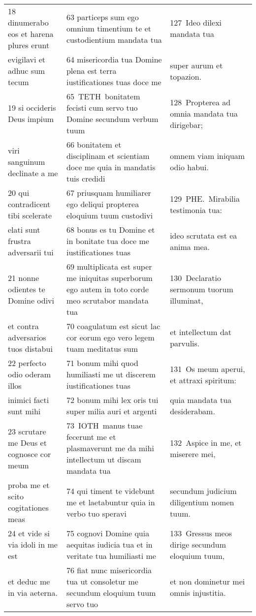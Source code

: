 \documentclass{article}
\begin{document}
\begin{longtable}{@{}p{}p{}p{}@{}}
18 dinumerabo eos et harena plures erunt	&	63 particeps sum ego omnium timentium te et custodientium mandata tua	&	127 Ideo dilexi mandata tua	\\
evigilavi et adhuc sum tecum	&	64 misericordia tua Domine plena est terra iustificationes tuas doce me	&	super aurum et topazion.	\\
19 si occideris Deus impium	&	65 TETH bonitatem fecisti cum servo tuo Domine secundum verbum tuum	&	128 Propterea ad omnia mandata tua dirigebar;	\\
viri sanguinum declinate a me	&	66 bonitatem et disciplinam et scientiam doce me quia in mandatis tuis credidi	&	omnem viam iniquam odio habui.	\\
20 qui contradicent tibi scelerate	&	67 priusquam humiliarer ego deliqui propterea eloquium tuum custodivi	&	129 PHE. Mirabilia testimonia tua:	\\
elati sunt frustra adversarii tui	&	68 bonus es tu Domine et in bonitate tua doce me iustificationes tuas	&	ideo scrutata est ea anima mea.	\\
21 nonne odientes te Domine odivi	&	69 multiplicata est super me iniquitas superborum ego autem in toto corde meo scrutabor mandata tua	&	130 Declaratio sermonum tuorum illuminat,	\\
et contra adversarios tuos distabui	&	70 coagulatum est sicut lac cor eorum ego vero legem tuam meditatus sum	&	et intellectum dat parvulis.	\\
22 perfecto odio oderam illos	&	71 bonum mihi quod humiliasti me ut discerem iustificationes tuas	&	131 Os meum aperui, et attraxi spiritum:	\\
inimici facti sunt mihi	&	72 bonum mihi lex oris tui super milia auri et argenti	&	quia mandata tua desiderabam.	\\
23 scrutare me Deus et cognosce cor meum	&	73 IOTH manus tuae fecerunt me et plasmaverunt me da mihi intellectum ut discam mandata tua	&	132 Aspice in me, et miserere mei,	\\
proba me et scito cogitationes meas	&	74 qui timent te videbunt me et laetabuntur quia in verbo tuo speravi	&	secundum judicium diligentium nomen tuum.	\\
24 et vide si via idoli in me est	&	75 cognovi Domine quia aequitas iudicia tua et in veritate tua humiliasti me	&	133 Gressus meos dirige secundum eloquium tuum,	\\
et deduc me in via aeterna.	&	76 fiat nunc misericordia tua ut consoletur me secundum eloquium tuum servo tuo	&	et non dominetur mei omnis injustitia.	\\

\end{longtable}
\end{document}
